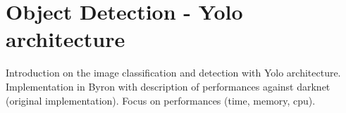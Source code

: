\documentclass{standalone}
\begin{document}
\section[Yolo]{Object Detection - Yolo architecture}\label{yolo}

Introduction on the image classification and detection with Yolo architecture.
Implementation in Byron with description of performances against darknet (original implementation).
Focus on performances (time, memory, cpu).
\end{document}
